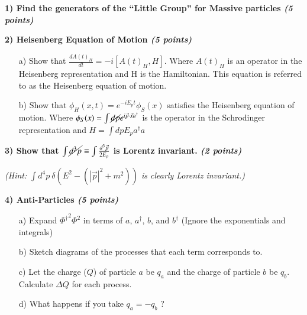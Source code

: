 {\large
\textbf{1) Find the generators of the ``Little Group'' for Massive particles \hfill \textit{(5 points)}}


\vspace*{0.25in}

\textbf{2) Heisenberg Equation of Motion \hfill \textit{(5 points)}}
\begin{itemize}
\item[a)] { Show that $\frac{dA(t)_H}{dt} = -i [A(t)_H, H]$.  Where $A(t)_H$ is an operator in the Heisenberg representation and H is the Hamiltonian. This equation is referred to as the Heisenberg equation of motion.}
\item[b)] { Show that $\phi_H(x,t) = e^{-iE_pt} \phi_S(x) $ satisfies the Heisenberg equation of motion. Where $\phi_S(x)= \int \cancel{dp} e^{i\vec{p}\cdot\vec{x} a^\dagger }$ is the operator in the Schrodinger representation and $H = \int dp E_p a^\dagger a$ }
\end{itemize}

\vspace*{0.25in}

\textbf{3) Show that $\int \cancel{d^3p} \equiv \int \frac{d^3\vec{p}}{2E_p}$ is Lorentz invariant. \hfill \textit{(2 points)}}

\textit{ (Hint: $\int d^4p\ \delta(E^2 - (|\vec{p}|^2 + m^2))$ is clearly Lorentz invariant.)}

\vspace*{0.25in}

\textbf{4) Anti-Particles  \hfill \textit{(5 points)}}
\begin{itemize}
\item[a)] {Expand ${\Phi^\dagger}^2 \Phi^2$  in terms of $a$, $a^\dagger$, $b$, and $b^\dagger$  (Ignore the exponentials and integrals)}
\item[b)] {Sketch diagrams of the processes that each term corresponds to.}
\item[c)] {Let the charge ($Q$) of particle $a$ be $q_a$ and the charge of particle $b$ be $q_b$.  Calculate $\Delta Q$ for each process. }
\item[d)] {What happens if you take $q_a = -q_b$ ?}
\end{itemize}





}


